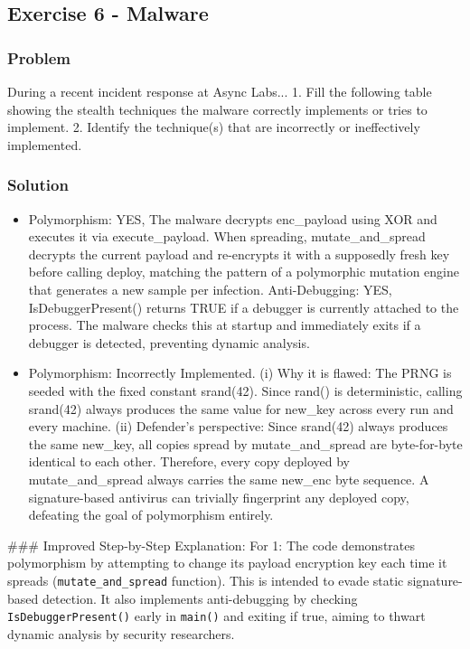\documentclass{article}
\begin{document}
\subsection{Exercise 6 - Malware}
\subsubsection*{Problem}
During a recent incident response at Async Labs... 1. Fill the following table showing the stealth techniques the malware correctly implements or tries to implement. 2. Identify the technique(s) that are incorrectly or ineffectively implemented.

\subsubsection*{Solution}
\begin{itemize}
    \item[\textbf{1.}] Polymorphism: YES, The malware decrypts enc\_payload using XOR and executes it via execute\_payload. When spreading, mutate\_and\_spread decrypts the current payload and re-encrypts it with a supposedly fresh key before calling deploy, matching the pattern of a polymorphic mutation engine that generates a new sample per infection. Anti-Debugging: YES, IsDebuggerPresent() returns TRUE if a debugger is currently attached to the process. The malware checks this at startup and immediately exits if a debugger is detected, preventing dynamic analysis.

    \item[\textbf{2.}] Polymorphism: Incorrectly Implemented. (i) Why it is flawed: The PRNG is seeded with the fixed constant srand(42). Since rand() is deterministic, calling srand(42) always produces the same value for new\_key across every run and every machine. (ii) Defender's perspective: Since srand(42) always produces the same new\_key, all copies spread by mutate\_and\_spread are byte-for-byte identical to each other. Therefore, every copy deployed by mutate\_and\_spread always carries the same new\_enc byte sequence. A signature-based antivirus can trivially fingerprint any deployed copy, defeating the goal of polymorphism entirely.

\end{itemize}
\#\#\# Improved Step-by-Step Explanation:
For 1: The code demonstrates polymorphism by attempting to change its payload encryption key each time it spreads (\texttt{mutate\_and\_spread} function). This is intended to evade static signature-based detection. It also implements anti-debugging by checking \texttt{IsDebuggerPresent()} early in \texttt{main()} and exiting if true, aiming to thwart dynamic analysis by security researchers.
\end{document}
